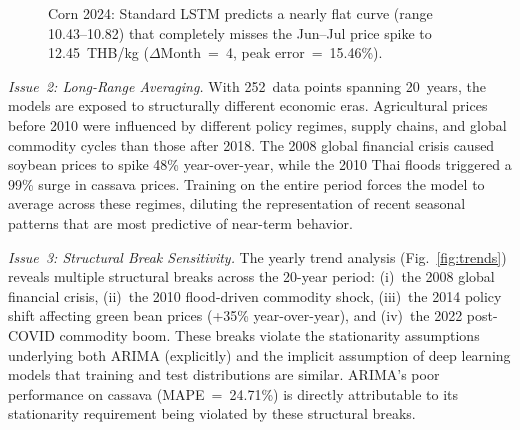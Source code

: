 \documentclass[journal]{IEEEtran}
\begin{document}
\begin{figure}[htbp]
  \centering
  \caption{Corn 2024: Standard LSTM predicts a nearly flat curve (range 10.43--10.82) that completely misses the Jun--Jul price spike to 12.45~THB/kg ($\Delta$Month~=~4, peak error~=~15.46\%).}
  \label{fig:lstm_corn_limit}
\end{figure}

\textit{Issue~2: Long-Range Averaging.} With 252~data points spanning 20~years, the models are exposed to structurally different economic eras. Agricultural prices before 2010 were influenced by different policy regimes, supply chains, and global commodity cycles than those after 2018. The 2008 global financial crisis caused soybean prices to spike 48\% year-over-year, while the 2010 Thai floods triggered a 99\% surge in cassava prices. Training on the entire period forces the model to average across these regimes, diluting the representation of recent seasonal patterns that are most predictive of near-term behavior.

\textit{Issue~3: Structural Break Sensitivity.} The yearly trend analysis (Fig.~\ref{fig:trends}) reveals multiple structural breaks across the 20-year period: (i)~the 2008 global financial crisis, (ii)~the 2010 flood-driven commodity shock, (iii)~the 2014 policy shift affecting green bean prices (+35\% year-over-year), and (iv)~the 2022 post-COVID commodity boom. These breaks violate the stationarity assumptions underlying both ARIMA (explicitly) and the implicit assumption of deep learning models that training and test distributions are similar. ARIMA's poor performance on cassava (MAPE~=~24.71\%) is directly attributable to its stationarity requirement being violated by these structural breaks.
\end{document}
